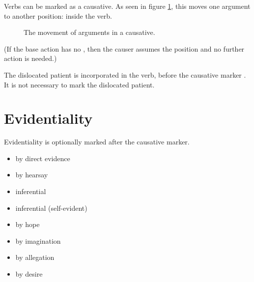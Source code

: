 \documentclass{book}
\begin{document}
Verbs can be marked as a causative. As seen in figure \ref{fig:caus1}, this moves one argument to another position: inside the verb.

\begin{figure}[h]
    \caption{The movement of arguments in a causative. \label{fig:caus1}}
    \centering
\end{figure}

(If the base action has no , then the causer assumes the  position and no further action is needed.)

The dislocated patient is incorporated in the verb, before the causative marker . It is not necessary to mark the dislocated patient.

\section{Evidentiality}

Evidentiality is optionally marked after the causative marker.

\begin{itemize}
    \item {} by direct evidence
    \item {} by hearsay
    \item {} inferential
    \item {} inferential (self-evident)
    \item {} by hope
    \item {} by imagination
    \item {} by allegation
    \item {} by desire
\end{itemize}
\end{document}
